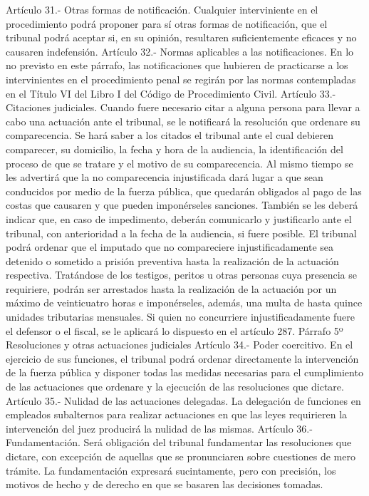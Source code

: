     Artículo 31.- Otras formas de notificación. Cualquier interviniente en el procedimiento podrá proponer para sí otras formas de notificación, que el tribunal podrá aceptar si, en su opinión, resultaren suficientemente eficaces y no causaren indefensión.
    Artículo 32.- Normas aplicables a las notificaciones. En lo no previsto en este párrafo, las notificaciones que hubieren de practicarse a los intervinientes en el procedimiento penal se regirán por las normas contempladas en el Título VI del Libro I del Código de Procedimiento Civil.
    Artículo 33.- Citaciones judiciales. Cuando fuere necesario citar a alguna persona para llevar a cabo una actuación ante el tribunal, se le notificará la resolución que ordenare su comparecencia.
    Se hará saber a los citados el tribunal ante el cual debieren comparecer, su domicilio, la fecha y hora de la audiencia, la identificación del proceso de que se tratare y el motivo de su comparecencia. Al mismo tiempo se les advertirá que la no comparecencia injustificada dará lugar a que sean conducidos por medio de la fuerza pública, que quedarán obligados al pago de las costas que causaren y que pueden imponérseles sanciones. También se les deberá indicar que, en caso de impedimento, deberán comunicarlo y justificarlo ante el tribunal, con anterioridad a la fecha de la audiencia, si fuere posible.
    El tribunal podrá ordenar que el imputado que no compareciere injustificadamente sea detenido o sometido a prisión preventiva hasta la realización de la actuación respectiva. Tratándose de los testigos, peritos u otras personas cuya presencia se requiriere, podrán ser arrestados hasta la realización de la actuación por un máximo de veinticuatro horas e imponérseles, además, una multa de hasta quince unidades tributarias mensuales.
    Si quien no concurriere injustificadamente fuere el defensor o el fiscal, se le aplicará lo dispuesto en el artículo 287.
    Párrafo 5º Resoluciones y otras actuaciones
judiciales
    Artículo 34.- Poder coercitivo. En el ejercicio de sus funciones, el tribunal podrá ordenar directamente la intervención de la fuerza pública y disponer todas las medidas necesarias para el cumplimiento de las actuaciones que ordenare y la ejecución de las resoluciones que dictare.
    Artículo 35.- Nulidad de las actuaciones delegadas. La delegación de funciones en empleados subalternos para realizar actuaciones en que las leyes requirieren la intervención del juez producirá la nulidad de las mismas.
    Artículo 36.- Fundamentación. Será obligación del tribunal fundamentar las resoluciones que dictare, con excepción de aquellas que se pronunciaren sobre cuestiones de mero trámite. La fundamentación expresará sucintamente, pero con precisión, los motivos de hecho y de derecho en que se basaren las decisiones tomadas.
